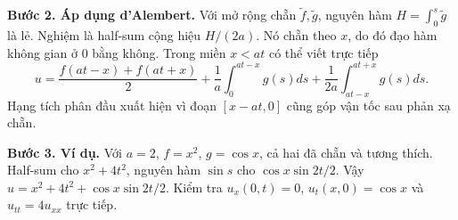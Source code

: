 \documentclass[10pt,a4paper]{article}
\begin{document}
\textbf{Bước 2. Áp dụng d'Alembert.} Với mở rộng chẵn $\widetilde f,\widetilde g$, nguyên hàm $H=\int_0^s\widetilde g$ là lẻ. Nghiệm là half-sum cộng hiệu $H/(2a)$. Nó chẵn theo $x$, do đó đạo hàm không gian ở $0$ bằng không. Trong miền $x<at$ có thể viết trực tiếp
\[u=\frac{f(at-x)+f(at+x)}2+\frac1a\int_0^{at-x}g(s)ds+\frac1{2a}\int_{at-x}^{at+x}g(s)ds.\]
Hạng tích phân đầu xuất hiện vì đoạn $[x-at,0]$ cũng góp vận tốc sau phản xạ chẵn.

\textbf{Bước 3. Ví dụ.} Với $a=2$, $f=x^2$, $g=\cos x$, cả hai đã chẵn và tương thích. Half-sum cho $x^2+4t^2$, nguyên hàm $\sin s$ cho $\cos x\sin2t/2$. Vậy $u=x^2+4t^2+\cos x\sin2t/2$. Kiểm tra $u_x(0,t)=0$, $u_t(x,0)=\cos x$ và $u_{tt}=4u_{xx}$ trực tiếp.
\end{document}
